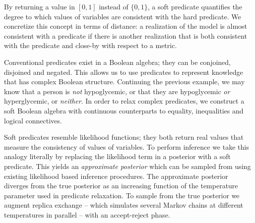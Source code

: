 By returning a value in $[0, 1]$ instead of $\{0, 1\}$, a soft predicate quantifies the degree to which values of variables are consistent with the hard predicate.
We concretize this concept in terms of distance: a realization of the model is almost consistent with a predicate if there is another realization that is both consistent with the predicate and close-by with respect to a metric.

Conventional predicates exist in a Boolean algebra; they can be conjoined, disjoined and negated.
This allows us to use predicates to represent knowledge that has complex Boolean structure.
Continuing the previous example, we may know that a person is \emph{not} hypoglycemic, or that they are hypoglycemic \emph{or} hyperglycemic, or \emph{neither}.
In order to relax complex predicates, we construct a soft Boolean algebra with continuous counterparts to equality, inequalities and logical connectives.

Soft predicates resemble likelihood functions; they both return real values that measure the consistency of values of variables.
To perform inference we take this analogy literally by replacing the likelihood term in a posterior with a soft predicate.
This yields an \emph{approximate posterior} which can be sampled from using existing likelihood based inference procedures.
The approximate posterior diverges from the true posterior as an increasing function of the temperature parameter used in predicate relaxation.
To sample from the true posterior we augment replica exchange -- which simulates several Markov chains at different temperatures in parallel -- with an accept-reject phase. 





